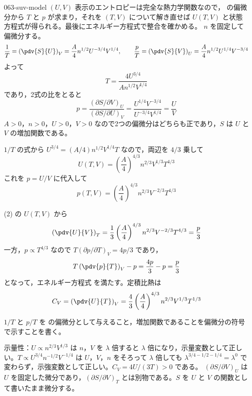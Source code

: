 \documentclass[uplatex,dvipdfmx,a4paper,11pt]{jsarticle}
\begin{document}
\begin{kaisetsu}{063-suv-model}
\houshin $(U,V)$ 表示のエントロピーは完全な熱力学関数なので， の偏微分から $T$ と $p$ が求まり，それを $(T,V)$ について解き直せば $U(T,V)$ と状態方程式が得られる。最後にエネルギー方程式で整合を確かめる。
\keisan {} $n$ を固定して偏微分する。
\[ \frac{1}{T} = \left(\pdv{S}{U}\right)_{V} = \frac{A}{4}n^{1/2}U^{-3/4}V^{1/4}, \qquad \frac{p}{T} = \left(\pdv{S}{V}\right)_{U} = \frac{A}{4}n^{1/2}U^{1/4}V^{-3/4} \]
よって
\[ T = \frac{4U^{3/4}}{An^{1/2}V^{1/4}} \]
であり，2式の比をとると
\[ p = \frac{(\partial S/\partial V)_{U}}{(\partial S/\partial U)_{V}} = \frac{U^{1/4}V^{-3/4}}{U^{-3/4}V^{1/4}} = \frac{U}{V} \]
$A > 0$，$n > 0$，$U > 0$，$V > 0$ なので2つの偏微分はどちらも正であり，$S$ は $U$ と $V$ の増加関数である。

 $1/T$ の式から $U^{3/4} = (A/4)n^{1/2}V^{1/4}T$ なので，両辺を $4/3$ 乗して
\[ U(T,V) = \left(\frac{A}{4}\right)^{4/3}n^{2/3}V^{1/3}T^{4/3} \]
これを $p = U/V$ に代入して
\[ p(T,V) = \left(\frac{A}{4}\right)^{4/3}n^{2/3}V^{-2/3}T^{4/3} \]

 (2) の $U(T,V)$ から
\[ \left(\pdv{U}{V}\right)_{T} = \frac{1}{3}\left(\frac{A}{4}\right)^{4/3}n^{2/3}V^{-2/3}T^{4/3} = \frac{p}{3} \]
一方，$p \propto T^{4/3}$ なので $T(\partial p/\partial T)_{V} = 4p/3$ であり，
\[ T\left(\pdv{p}{T}\right)_{V} - p = \frac{4p}{3} - p = \frac{p}{3} \]
となって，エネルギー方程式  を満たす。定積比熱は
\[ C_{V} = \left(\pdv{U}{T}\right)_{V} = \frac{4}{3}\left(\frac{A}{4}\right)^{4/3}n^{2/3}V^{1/3}T^{1/3} \]
\begin{ronten}
  \item {} $1/T$ と $p/T$ を  の偏微分として与えること，増加関数であることを偏微分の符号で示すことを書く。
\end{ronten}
\kenzan 示量性：$U \propto n^{2/3}V^{1/3}$ は $n$，$V$ を $\lambda$ 倍すると $\lambda$ 倍になり，示量変数として正しい。$T \propto U^{3/4}n^{-1/2}V^{-1/4}$ は $U$，$V$，$n$ をそろって $\lambda$ 倍しても $\lambda^{3/4 - 1/2 - 1/4} = \lambda^{0}$ で変わらず，示強変数として正しい。$C_{V} = 4U/(3T) > 0$ である。
\tsumazuki $(\partial S/\partial V)_{U}$ は $U$ を固定した微分であり，$(\partial S/\partial V)_{T}$ とは別物である。$S$ を $U$ と $V$ の関数として書いたまま微分する。
\end{kaisetsu}
\end{document}
